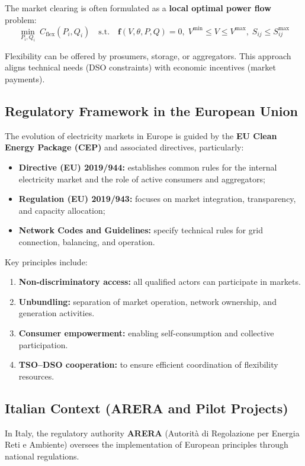 \documentclass[11pt]{article}
\begin{document}
	The market clearing is often formulated as a \textbf{local optimal power flow} problem:
	\[
	\min_{P_i, Q_i} \; C_\text{flex}(P_i, Q_i)
	\quad \text{s.t.} \quad
	\mathbf{f}(V, \theta, P, Q) = 0, \;
	V^{\min} \le V \le V^{\max}, \;
	S_{ij} \le S_{ij}^{\max}
	\]
	
	Flexibility can be offered by prosumers, storage, or aggregators.  
	This approach aligns technical needs (DSO constraints) with economic incentives (market payments).
	
	\subsection{Regulatory Framework in the European Union}
	
	The evolution of electricity markets in Europe is guided by the \textbf{EU Clean Energy Package (CEP)} and associated directives, particularly:
	\begin{itemize}
		\item \textbf{Directive (EU) 2019/944:} establishes common rules for the internal electricity market and the role of active consumers and aggregators;
		\item \textbf{Regulation (EU) 2019/943:} focuses on market integration, transparency, and capacity allocation;
		\item \textbf{Network Codes and Guidelines:} specify technical rules for grid connection, balancing, and operation.
	\end{itemize}
	
	Key principles include:
	\begin{enumerate}
		\item \textbf{Non-discriminatory access:} all qualified actors can participate in markets.
		\item \textbf{Unbundling:} separation of market operation, network ownership, and generation activities.
		\item \textbf{Consumer empowerment:} enabling self-consumption and collective participation.
		\item \textbf{TSO–DSO cooperation:} to ensure efficient coordination of flexibility resources.
	\end{enumerate}
	
	\subsection{Italian Context (ARERA and Pilot Projects)}
	
	In Italy, the regulatory authority \textbf{ARERA} (Autorità di Regolazione per Energia Reti e Ambiente) oversees the implementation of European principles through national regulations.
	
\end{document}
